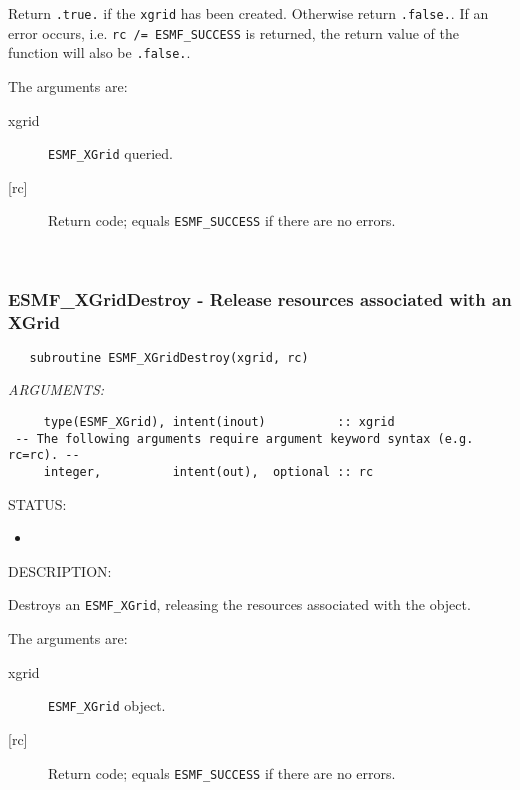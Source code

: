      Return {\tt .true.} if the {\tt xgrid} has been created. Otherwise return 
     {\tt .false.}. If an error occurs, i.e. {\tt rc /= ESMF\_SUCCESS} is 
     returned, the return value of the function will also be {\tt .false.}.
  
   The arguments are:
     \begin{description}
     \item[xgrid]
       {\tt ESMF\_XGrid} queried.
     \item[{[rc]}]
       Return code; equals {\tt ESMF\_SUCCESS} if there are no errors.
     \end{description}
   
 
\mbox{}\hrulefill\ 
 
\subsubsection [ESMF\_XGridDestroy] {ESMF\_XGridDestroy - Release resources associated with an XGrid}


\begin{verbatim} 
   subroutine ESMF_XGridDestroy(xgrid, rc)\end{verbatim}{\em ARGUMENTS:}
\begin{verbatim}     type(ESMF_XGrid), intent(inout)          :: xgrid       
 -- The following arguments require argument keyword syntax (e.g. rc=rc). --
     integer,          intent(out),  optional :: rc     \end{verbatim}
{\sf STATUS:}
   \begin{itemize}
   \item{}
   \end{itemize}
  
{\sf DESCRIPTION:\\ }


   Destroys an {\tt ESMF\_XGrid}, releasing the resources associated
   with the object.
   
   The arguments are:
   \begin{description}
   \item [xgrid]
         {\tt ESMF\_XGrid} object.
   \item [{[rc]}] 
         Return code; equals {\tt ESMF\_SUCCESS} if there are no errors.
   \end{description}
  
\setlength{\parskip}{\oldparskip}
\setlength{\parindent}{\oldparindent}
\setlength{\baselineskip}{\oldbaselineskip}

